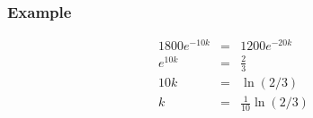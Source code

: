 \begin{frame}
  \frametitle{Example}

  \begin{eqnarray*}
    1800 e^{-10k} & = & 1200 e^{-20k} \\
    e^{10k} & = & \frac{2}{3} \\
    10k & = & \ln(2/3) \\
    k & = & \frac{1}{10} \ln(2/3)
  \end{eqnarray*}

\end{frame}



